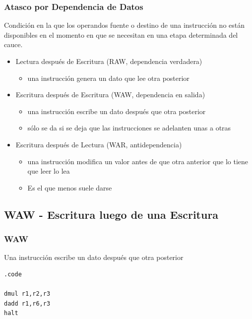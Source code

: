 \documentclass{beamer}
\begin{document}
\begin{frame}
\frametitle{Atasco por Dependencia de Datos}

Condición en la que los operandos fuente o destino de una instrucción no están disponibles en el momento en que se necesitan en una etapa determinada del cauce.
\begin{itemize}

\item Lectura después de Escritura (RAW, dependencia verdadera)
\begin{itemize}
\item  una instrucción genera un dato que lee otra posterior
\end{itemize}

\item Escritura después de Escritura (WAW, dependencia en salida)
\begin{itemize}
\item una instrucción escribe un dato después que otra posterior
\item sólo se da si se deja que las instrucciones se adelanten unas a otras
\end{itemize}

\item Escritura después de Lectura (WAR, antidependencia)
\begin{itemize}
\item una instrucción modifica un valor antes de que otra anterior que lo tiene que leer lo lea
\item Es el que menos suele darse
\end{itemize}
\end{itemize}
\end{frame}


\subsection{WAW - Escritura luego de una Escritura}
\begin{frame}[fragile]
\frametitle{WAW}
Una instrucción escribe un dato después que otra posterior
\begin{block}{}
\begin{lstlisting}[basicstyle=\ttfamily,keywordstyle=\color{blue}]
.code

dmul r1,r2,r3
dadd r1,r6,r3
halt
\end{lstlisting}
\end{block}

\end{frame}
\end{document}
